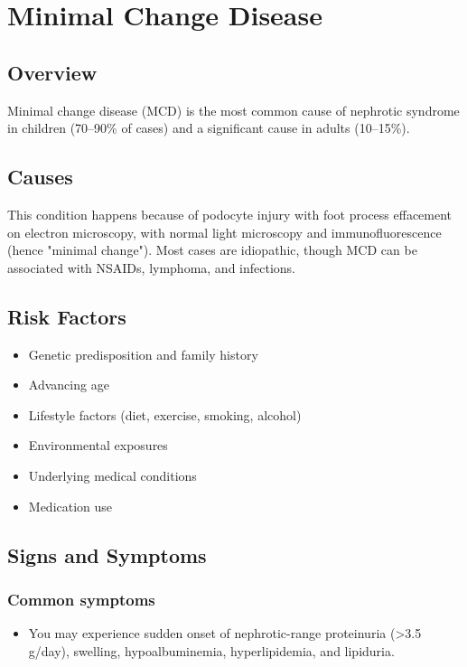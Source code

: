 \chapter{Minimal Change Disease}
\label{sec:Minimal Change Disease}

\section{Overview}
Minimal change disease (MCD) is the most common cause of nephrotic syndrome in children (70--90\% of cases) and a significant cause in adults (10--15\%).
\section{Causes}
This condition happens because of podocyte injury with foot process effacement on electron microscopy, with normal light microscopy and immunofluorescence (hence "minimal change"). Most cases are idiopathic, though MCD can be associated with NSAIDs, lymphoma, and infections.     
\section{Risk Factors}

\begin{itemize}[noitemsep]
  \item Genetic predisposition and family history
  \item Advancing age
  \item Lifestyle factors (diet, exercise, smoking, alcohol)
  \item Environmental exposures
  \item Underlying medical conditions
  \item Medication use
\end{itemize}
\section{Signs and Symptoms}

\subsection{Common symptoms}
\begin{itemize}[noitemsep]
  \item You may experience sudden onset of nephrotic-range proteinuria (>3.5 g/day), swelling, hypoalbuminemia, hyperlipidemia, and lipiduria. 
  \end{itemize}

